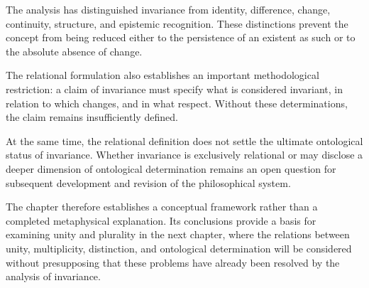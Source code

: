 The analysis has distinguished invariance from identity,
difference, change, continuity, structure, and epistemic
recognition. These distinctions prevent the concept from
being reduced either to the persistence of an existent as
such or to the absolute absence of change.

The relational formulation also establishes an important
methodological restriction: a claim of invariance must
specify what is considered invariant, in relation to which
changes, and in what respect. Without these determinations,
the claim remains insufficiently defined.

At the same time, the relational definition does not settle
the ultimate ontological status of invariance. Whether
invariance is exclusively relational or may disclose a
deeper dimension of ontological determination remains an
open question for subsequent development and revision of
the philosophical system.

The chapter therefore establishes a conceptual framework
rather than a completed metaphysical explanation. Its
conclusions provide a basis for examining unity and plurality
in the next chapter, where the relations between unity,
multiplicity, distinction, and ontological determination
will be considered without presupposing that these problems
have already been resolved by the analysis of invariance.

